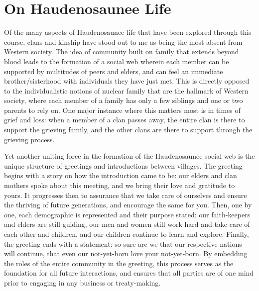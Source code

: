 \documentclass{report}
\begin{document}
\section{On Haudenosaunee Life}

\hspace{24pt} Of the many aspects of Haudenosaunee life that have been explored through this course, clans and kinship have stood out to me as being the most absent from Western society. The idea of community built on family that extends beyond blood leads to the formation of a social web wherein each member can be supported by multitudes of peers and elders, and can feel an immediate brother/sisterhood with individuals they have just met. This is directly opposed to the individualistic notions of nuclear family that are the hallmark of Western society, where each member of a family has only a few siblings and one or two parents to rely on. One major instance where this matters most is in times of grief and loss: when a member of a clan passes away, the entire clan is there to support the grieving family, and the other clans are there to support through the grieving process.

\hspace{24pt} Yet another uniting force in the formation of the Haudenosaunee social web is the unique structure of greetings and introductions between villages. 
The greeting begins with a story on how the introduction came to be: our elders  and clan mothers spoke about this meeting, and we bring their love and gratitude to yours. It progresses then to assurance that we take care of ourselves and ensure the thriving of future generations, and encourage the same for you.
Then, one by one, each demographic is represented and their purpose stated: our faith-keepers and elders are still guiding, our men and women still work hard and take care of each other and children, and our children continue to learn and explore. Finally, the greeting ends with a statement: so sure are we that our respective nations will continue, that even our not-yet-born love your not-yet-born.
By embedding the roles of the entire community in the greeting, this process serves as the foundation for all future interactions, and ensures that all parties are of one mind prior to engaging in any business or treaty-making.


\end{document}
